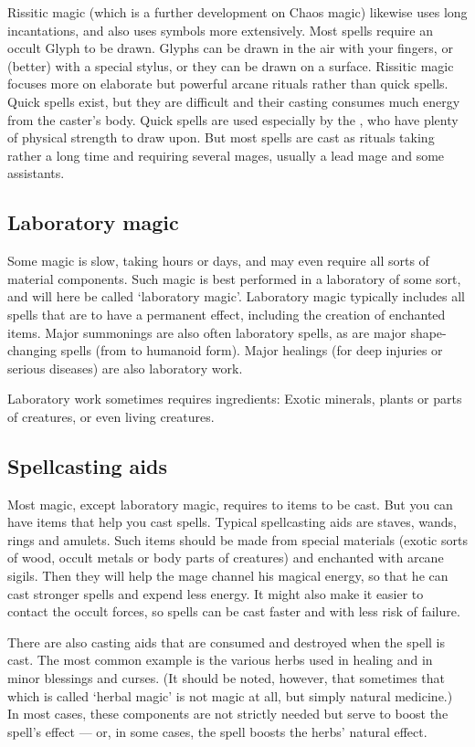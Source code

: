 Rissitic magic (which is a further development on Chaos magic) likewise uses long incantations, and also uses symbols more extensively. Most spells require an occult Glyph to be drawn. Glyphs can be drawn in the air with your fingers, or (better) with a special stylus, or they can be drawn on a surface. Rissitic magic focuses more on elaborate but powerful arcane rituals rather than quick spells. Quick spells exist, but they are difficult and their casting consumes much energy from the caster's body. Quick spells are used especially by the \Ashenoch, who have plenty of physical strength to draw upon. But most spells are cast as rituals taking rather a long time and requiring several mages, usually a lead mage and some assistants. 

\subsection{Laboratory magic}
Some magic is slow, taking hours or days, and may even require all sorts of material components. Such magic is best performed in a laboratory of some sort, and will here be called `laboratory magic'. Laboratory magic typically includes all spells that are to have a permanent effect, including the creation of enchanted items. Major summonings are also often laboratory spells, as are major shape-changing spells (from \dragon{} to humanoid form). Major healings (for deep injuries or serious diseases) are also laboratory work. 

Laboratory work sometimes requires ingredients: Exotic minerals, plants or parts of creatures, or even living creatures. 

\subsection{Spellcasting aids}
Most magic, except laboratory magic, requires to items to be cast. But you can have items that help you cast spells. Typical spellcasting aids are staves, wands, rings and amulets. Such items should be made from special materials (exotic sorts of wood, occult metals or body parts of creatures) and enchanted with arcane sigils. Then they will help the mage channel his magical energy, so that he can cast stronger spells and expend less energy. It might also make it easier to contact the occult forces, so spells can be cast faster and with less risk of failure. 

There are also casting aids that are consumed and destroyed when the spell is cast. The most common example is the various herbs used in healing and in minor blessings and curses. (It should be noted, however, that sometimes that which is called `herbal magic' is not magic at all, but simply natural medicine.) In most cases, these components are not strictly needed but serve to boost the spell's effect --- or, in some cases, the spell boosts the herbs' natural effect. 



